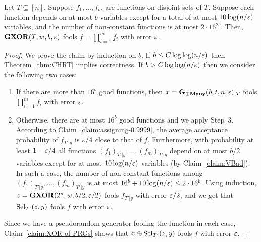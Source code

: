 \begin{claim}\label{claim:correctness}
Let $T \subseteq [n]$.
Suppose $f_1, \ldots, f_m$ are functions on disjoint sets of $T$.
Suppose each function depends on at most $b$ variables except for a total of at most $10 \log(n/\varepsilon)$ variables, and the number of non-constant functions is at most $2 \cdot 16^{2b}$.
Then, $\mathbf{GXOR}(T,w, b,\varepsilon)$ fools $f = \prod_{i=1}^{m} f_i$ with error $\varepsilon$.
\end{claim}
\begin{proof}
We prove the claim by induction on $b$.
	If $b \le C \log \log(n/\varepsilon)$ then Theorem~\ref{thm:CHRT} implies correctness.
	If $b > C \log \log(n/\varepsilon)$ then we
	consider the following two cases:
	\begin{enumerate}
		\item If there are more than $16^b$ good functions, then $x = \mathbf{G_{\oplus Many}}(b,t,n,\varepsilon)|_{T}$ fools $\prod_{i=1}^{m}f_i$ with error $\varepsilon$.
		\item Otherwise, there are at most $16^b$ good functions and we apply Step~3. According to Claim~\ref{claim:assigning-0.9999}, the average acceptance probability of $f_{T'|y}$ is $\varepsilon/4$ close to that of $f$. 
	Furthermore, with  probability at least $1-\varepsilon/4$ all functions $(f_1)_{T'|y}, \ldots, (f_m)_{T'|y}$ depend on at most $b/2$ variables except for at most $10 \log(n/\varepsilon)$ variables (by Claim~\ref{claim:VBad}).
	In such a case, the number of non-constant functions among $(f_1)_{T'|y}, \ldots, (f_m)_{T'|y}$ is at most $16^{b} + 10\log(n/\varepsilon) \le 2\cdot 16^{b}$.
	Using induction, $z = \mathbf{GXOR}(T',w,b/2,\varepsilon/2)$ fools $f_{T'|y}$ with error $\varepsilon/2$, and we get that $\mathrm{Sel}_{T'}(z,y)$ fools $f$ with error $\varepsilon$.

	\end{enumerate}
	Since we have a pseudorandom generator fooling the function in each case,
	 Claim~\ref{claim:XOR-of-PRGs} shows that $x \oplus \mathrm{Sel}_{T'}(z,y)$ fools $f$ with error $\varepsilon$.
	\end{proof}
	
	


